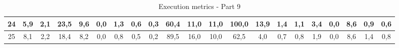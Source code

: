 \begin{sidewaystable}[]
\begin{tabular}{|c|c|c|c|c|c|c|c|c|c|c|c|c|c|c|c|c|c|c|c|c|}
    24 & 5,9                                              & 2,1                                              & 23,5                                             & 9,6                                              & 0,0                                              & 1,3                                              & 0,6                                              & 0,3                                              & 60,4                                            & 11,0                                            & 11,0                                            & 100,0                                           & 13,9                                            & 1,4                                             & 1,1                                             & 3,4                                             & 0,0                                             & 8,6                                              & 0,9                                              &  0,6                                               \\ \hline
    25 & 8,1                                              & 2,2                                              & 18,4                                             & 8,2                                              & 0,0                                              & 0,8                                              & 0,5                                              & 0,2                                              & 89,5                                            & 16,0                                            & 10,0                                            & 62,5                                            & 4,0                                             & 0,7                                             & 0,8                                             & 1,9                                             & 0,0                                             & 8,6                                              & 1,4                                              &  0,8                                               \\ \hline
    \end{tabular}
    \caption{Execution metrics - Part 9}
    \label{tab:ap:exec_metrics_9}
\end{sidewaystable}

